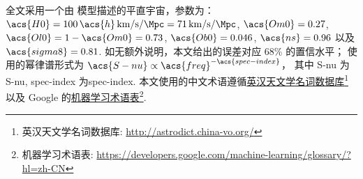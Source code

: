 全文采用一个由 \lcdm 模型描述的平直宇宙，参数为：
$\acs{H0} = 100\,\acs{h}\,\si{\km\per\second\per\Mpc}
= \SI{71}{\km\per\second\per\Mpc}$,
$\acs{Om0} = 0.27$,
$\acs{Ol0} = 1 - \acs{Om0} = 0.73$,
$\acs{Ob0} = 0.046$,
$\acs{ns} = 0.96$ 以及 $\acs{sigma8} = 0.81$.
如无额外说明，本文给出的误差对应 68\% 的置信水平；
使用的幂律谱形式为 $\acs{S-nu} \propto \acs{freq}^{-\acs{spec-index}}$，
其中 \acs{S-nu} 为\acl{S-nu}, \acs{spec-index} 为\acl{spec-index}.
本文使用的中文术语遵循\href{%
  http://astrodict.china-vo.org/
}{英汉天文学名词数据库}\footnote{%
  英汉天文学名词数据库:
  \url{http://astrodict.china-vo.org/}}
以及 Google 的\href{%
  https://developers.google.com/machine-learning/glossary/?hl=zh-CN
}{机器学习术语表}\footnote{%
  机器学习术语表:
  \url{https://developers.google.com/machine-learning/glossary/?hl=zh-CN}}.


